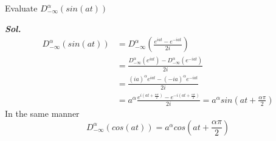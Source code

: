 


\newpage
\begin{example}
    Evaluate $\displaystyle D_{-\infty}^{\alpha} (sin(at))$

    \textit{ \textbf{Sol.} }
    \begin{align*}
        D_{-\infty}^{\alpha} (sin(at)) &=  D_{-\infty}^{\alpha} \left(\frac{e^{iat}-e^{-iat}}{2i}\right)
        \\
        &= \frac{D_{-\infty}^{\alpha}(e^{iat})-D_{-\infty}^{\alpha}(e^{-iat})}{2i}
        \\
        &= \frac{(ia)^\alpha e^{iat} - (-ia)^\alpha e^{-iat}}{2i}
        \\
        &= a^\alpha \frac{e^{i\left(at+\frac{\alpha \pi}{2}\right)} - e^{-i\left(at+\frac{\alpha \pi}{2}\right)}}{2i} = a^\alpha sin\left(at+\frac{\alpha \pi}{2}\right)
    \end{align*}
    In the same manner 
    \[
        D_{-\infty}^{\alpha} (cos(at))  = a^\alpha cos\left(at+\frac{\alpha \pi}{2}\right)
    \]
\end{example}

